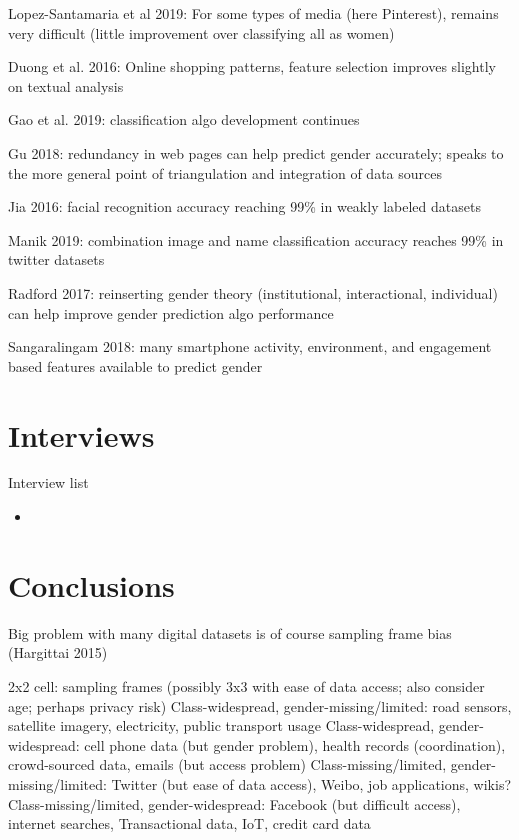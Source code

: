 \documentclass{article}
\begin{document}
Lopez-Santamaria et al 2019: For some types of media (here Pinterest), remains very difficult (little improvement over classifying all as women)

Duong et al. 2016: Online shopping patterns, feature selection improves slightly on textual analysis

Gao et al. 2019: classification algo development continues

Gu 2018: redundancy in web pages can help predict gender accurately; speaks to the more general point of triangulation and integration of data sources

Jia 2016: facial recognition accuracy reaching 99\% in weakly labeled datasets

Manik 2019: combination image and name classification accuracy reaches 99\% in twitter datasets

Radford 2017: reinserting gender theory (institutional, interactional, individual) can help improve gender prediction algo performance

Sangaralingam 2018: many smartphone activity, environment, and engagement based features available to predict gender

\section{Interviews}


Interview list

\begin{itemize}
    \item
\end{itemize}


\section{Conclusions}

Big problem with many digital datasets is of course sampling frame bias (Hargittai 2015)

2x2 cell: sampling frames (possibly 3x3 with ease of data access; also consider age; perhaps privacy risk)
Class-widespread, gender-missing/limited: road sensors, satellite imagery, electricity, public transport usage
Class-widespread, gender-widespread: cell phone data (but gender problem), health records (coordination), crowd-sourced data, emails (but access problem)
Class-missing/limited, gender-missing/limited: Twitter (but ease of data access), Weibo, job applications, wikis?
Class-missing/limited, gender-widespread: Facebook (but difficult access), internet searches, Transactional data, IoT, credit card data
\end{document}
